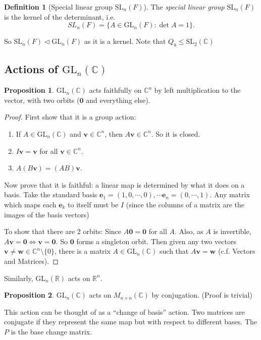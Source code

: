 \documentclass[a4paper]{article}
\theoremstyle{definition}
\newtheorem*{prop}{Proposition}
\newtheorem*{defi}{Definition}
\newcommand{\mb}[1]{\mathbf{#1}}
\newcommand{\R}{\mathbb{R}}
\newcommand{\C}{\mathbb{C}}
\newcommand{\GL}{\mathrm{GL}}
\newcommand{\SL}{\mathrm{SL}}
\begin{document}
\begin{defi}[Special linear group $\SL_n(F)$]
  The \emph{special linear group} $\SL_n(F)$ is the kernel of the determinant, i.e.
  \[
  SL_n(F) = \{A\in \GL_n(F): \det A = 1\}.
  \]
\end{defi}

So $\SL_n(F)\lhd \GL_n(F)$ as it is a kernel. Note that $Q_8\leq \SL_2(\C)$
\subsection{Actions of \texorpdfstring{$\GL_n(\C)$}{GLn(C)}}
\begin{prop}
  $\GL_n(\mb{\C})$ acts faithfully on $\C^n$ by left multiplication to the vector, with two orbits ($\mb{0}$ and everything else).
\end{prop}

\begin{proof}
  First show that it is a group action:
  \begin{enumerate}[label=\arabic{*}.]
    \setcounter{enumi}{0}
  \item If $A\in \GL_n(\C)$ and $\mb{v}\in \C^n$, then $A\mb{v}\in \C^n$. So it is closed.
  \item $I\mb{v} = \mb{v}$ for all $\mb{v}\in \C^n$.
  \item $A(B\mb{v}) = (AB)\mb{v}$.
  \end{enumerate}

  Now prove that it is faithful: a linear map is determined by what it does on a basis. Take the standard basis $\mb{e}_1 = (1, 0, \cdots, 0), \cdots \mb{e}_n = (0, \cdots, 1)$. Any matrix which maps each $\mb{e}_k$ to itself must be $I$ (since the columns of a matrix are the images of the basis vectors)

  To show that there are 2 orbits: Since $A\mb{0} = \mb{0}$ for all $A$. Also, as $A$ is invertible, $A\mb{v} = \mb{0}\Leftrightarrow \mb{v} = \mb{0}$. So $\mb{0}$ forms a singleton orbit. Then given any two vectors $\mb{v}\not= \mb{w}\in \C^n\setminus\{0\}$, there is a matrix $A\in \GL_n(\C)$ such that $A\mb{v} = \mb{w}$ (c.f. Vectors and Matrices).
\end{proof}

Similarly, $\GL_n(\R)$ acts on $\R^n$.

\begin{prop}
  $\GL_n(\C)$ acts on $M_{n\times n}(\C)$ by conjugation. (Proof is trivial)
\end{prop}
This action can be thought of as a ``change of basis'' action. Two matrices are conjugate if they represent the same map but with respect to different bases. The $P$ is the base change matrix.
\end{document}
